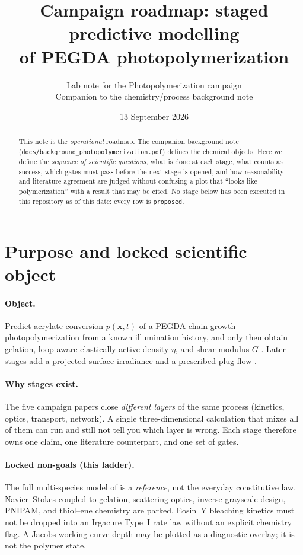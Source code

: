 \documentclass[11pt,a4paper]{article}
\title{Campaign roadmap: staged predictive modelling\\
of PEGDA photopolymerization}
\author{Lab note for the Photopolymerization campaign\\
\small Companion to the chemistry/process background note}
\date{13 September 2026}
\newcommand{\tagproposed}{\texttt{proposed}}
\begin{document}
\maketitle

\begin{abstract}
\noindent
This note is the \emph{operational} roadmap.
The companion background note (\texttt{docs/background\_photopolymerization.pdf}) defines the chemical objects.
Here we define the \emph{sequence of scientific questions}, what is done at each stage, what counts as success, which gates must pass before the next stage is opened, and how reasonability and literature agreement are judged without confusing a plot that ``looks like polymerization'' with a result that may be cited.
No stage below has been executed in this repository as of this date: every row is \tagproposed.
\end{abstract}

\tableofcontents
\vspace{0.6em}

\section{Purpose and locked scientific object}

\paragraph{Object.}
Predict acrylate conversion $p(\mathbf{x},t)$ of a PEGDA chain-growth photopolymerization from a known illumination history, and only then obtain gelation, loop-aware elastically active density $\eta$, and shear modulus $G$ \citep{Zhu2020}.
Later stages add a projected surface irradiance \citep{Meenakshisundaram2020,Montgomery2022} and a prescribed plug flow \citep{Slutzky2019}.

\paragraph{Why stages exist.}
The five campaign papers close \emph{different layers} of the same process (kinetics, optics, transport, network).
A single three-dimensional calculation that mixes all of them can run and still not tell you which layer is wrong.
Each stage therefore owns one claim, one literature counterpart, and one set of gates.

\paragraph{Locked non-goals (this ladder).}
The full multi-species model of \citet{Dobson2024} is a \emph{reference}, not the everyday constitutive law.
Navier--Stokes coupled to gelation, scattering optics, inverse grayscale design, PNIPAM, and thiol--ene chemistry are parked.
Eosin~Y bleaching kinetics \citep{Zhu2020} must not be dropped into an Irgacure Type~I rate law without an explicit chemistry flag.
A Jacobs working-curve depth \citep{Jacobs1992book} may be plotted as a diagnostic overlay; it is not the polymer state.
\end{document}
